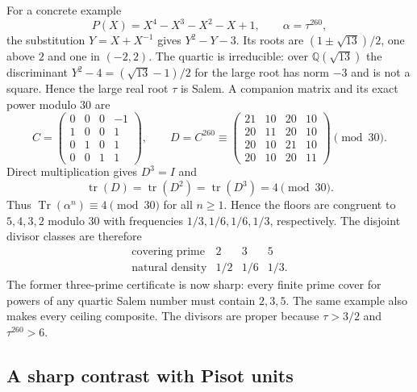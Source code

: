 \documentclass[11pt,a4paper]{article}
\theoremstyle{definition}
\theoremstyle{remark}
\numberwithin{equation}{section}
\begin{document}
For a concrete example
\[
 P(X)=X^4-X^3-X^2-X+1,\qquad \alpha=\tau^{260},
\]
the substitution $Y=X+X^{-1}$ gives $Y^2-Y-3$.
Its roots are $(1\pm\sqrt{13})/2$, one above $2$ and one in $(-2,2)$.
The quartic is irreducible: over $\mathbb Q(\sqrt{13})$ the discriminant
$Y^2-4=(\sqrt{13}-1)/2$ for the large root has norm $-3$ and is not a
square. Hence the large real root $\tau$ is Salem. A companion matrix
and its exact power modulo $30$ are
\[
 C=\begin{pmatrix}0&0&0&-1\\1&0&0&1\\0&1&0&1\\0&0&1&1\end{pmatrix},
 \qquad
 D=C^{260}\equiv
 \begin{pmatrix}21&10&20&10\\20&11&20&10\\20&10&21&10\\20&10&20&11\end{pmatrix}
 \pmod{30}.
\]
Direct multiplication gives $D^3=I$ and
\[
\operatorname{tr}(D)=\operatorname{tr}(D^2)=\operatorname{tr}(D^3)=4\pmod{30}.
\]
Thus
$\operatorname{Tr}(\alpha^n)\equiv4\pmod{30}$ for all $n\ge1$.
Hence the floors are congruent to $5,4,3,2$ modulo $30$ with frequencies
$1/3,1/6,1/6,1/3$, respectively.  The disjoint divisor classes are
therefore
\[
 \begin{array}{c|ccc}
 \text{covering prime}&2&3&5\\ \hline
 \text{natural density}&1/2&1/6&1/3.
 \end{array}
\]
The former three-prime certificate is now sharp: every finite prime
cover for powers of any quartic Salem number must contain $2,3,5$.
The same example also makes every ceiling composite. The divisors
are proper because $\tau>3/2$ and $\tau^{260}>6$.

\subsection{A sharp contrast with Pisot units}
\end{document}
